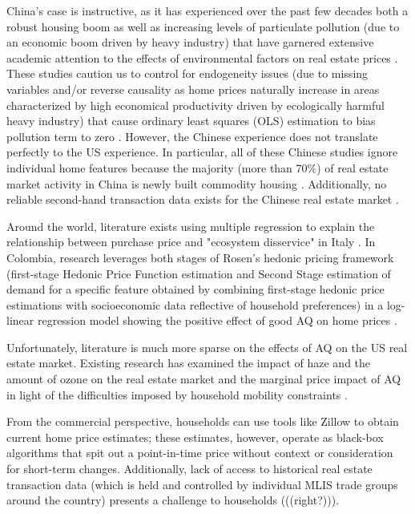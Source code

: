 \documentclass[sigconf,nonacm,11pt]{acmart}
\begin{document}
China's case is instructive, as it has experienced over the past few decades both a robust housing boom as well as increasing levels of particulate pollution (due to an economic boom driven by heavy industry) that have garnered extensive academic attention to the effects of environmental factors on real estate prices \cite{Chen2017} \cite{Chen2019} \cite{Wang2021} \cite{Zheng2014} \cite{Sun2020} \cite{Dai2020} \cite{Mei2020}. These studies caution us to control for endogeneity issues (due to missing variables and/or reverse causality as home prices naturally increase in areas characterized by high economical productivity driven by ecologically harmful heavy industry) that cause ordinary least squares (OLS) estimation to bias pollution term to zero \cite{Zheng2014} \cite{Chen2017} \cite{Chen2019}. However, the Chinese experience does not translate perfectly to the US experience. In particular, all of these Chinese studies ignore individual home features because the majority (more than 70\%) of real estate market activity in China is newly built commodity housing \cite{Chen2017}. Additionally, no reliable second-hand transaction data exists for the Chinese real estate market \cite{Zheng2014}.

Around the world, literature exists using multiple regression to explain the relationship between purchase price and "ecosystem disservice" in Italy \cite{Nestico2020}. In Colombia, research leverages both stages of Rosen's hedonic pricing framework (first-stage Hedonic Price Function estimation and Second Stage estimation of demand for a specific feature obtained by combining first-stage hedonic price estimations with socioeconomic data reflective of household preferences) \cite{Rosen1974} in a log-linear regression model showing the positive effect of good AQ on home prices \cite{Carriazo2018}.

Unfortunately, literature is much more sparse on the effects of AQ on the US real estate market. Existing research has examined the impact of haze and the amount of ozone on the real estate market \cite{Anselin2006} and the marginal price impact of AQ in light of the difficulties imposed by household mobility constraints \cite{Bayer2009}.

From the commercial perspective, households can use tools like Zillow to obtain current home price estimates; these estimates, however, operate as black-box algorithms that spit out a point-in-time price without context or consideration for short-term changes. Additionally, lack of access to historical real estate transaction data (which is held and controlled by individual MLIS trade groups around the country) presents a challenge to households (((right?))).
\end{document}
